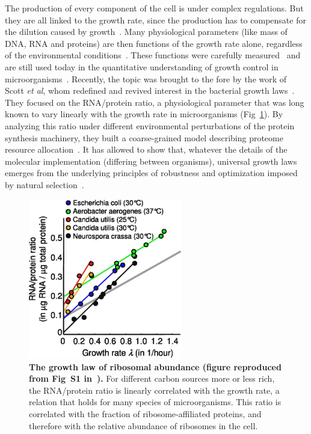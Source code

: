 The production of every component of the cell is under complex regulations.
But they are all linked to the growth rate, since the production has to compensate for the dilution caused by growth~\cite{monod_growth_1949}.
Many physiological parameters (like mass of DNA, RNA and proteins) are then functions of the growth rate alone, regardless of the environmental conditions~\cite{schaechter_dependency_1958,bremer_modulation_1996}.
These functions were carefully measured~\cite{bremer_modulation_1996} and are still used today in the quantitative understanding of growth control in microorganisms~\cite{ehrenberg_mediumdependent_2012}.
Recently, the topic was brought to the fore by the work of Scott \textit{et al}, whom redefined and revived interest in the bacterial growth laws~\cite{scott_bacterial_2011}.
They focused on the RNA/protein ratio, a physiological parameter that was long known to vary linearly with the growth rate in microorganisms (Fig~\ref{fig:scott_rnaprot}).
By analyzing this ratio under different environmental perturbations of the protein synthesis machinery, they built a coarse-grained model describing proteome resource allocation~\cite{scott_emergence_2014}.
It has allowed to show that, whatever the details of the molecular implementation (differing between organisms), universal growth laws emerges from the underlying principles of robustness and optimization imposed by natural selection~\cite{scott_emergence_2014}.  %

\begin{figure}[tb]
\centering
\includegraphics[height=7cm]{./Fig/Chapter1/scott_rnaprot.eps}
\caption{
\textbf{The growth law of ribosomal abundance (figure reproduced from Fig~S1 in~\cite{scott_interdependence_2010}).}
For different carbon sources more or less rich, the RNA/protein ratio is linearly correlated with the growth rate, a relation that holds for many species of microorganisms.
This ratio is correlated with the fraction of ribosome-affiliated proteins, and therefore with the relative abundance of ribosomes in the cell.
}
\label{fig:scott_rnaprot}
\end{figure}

